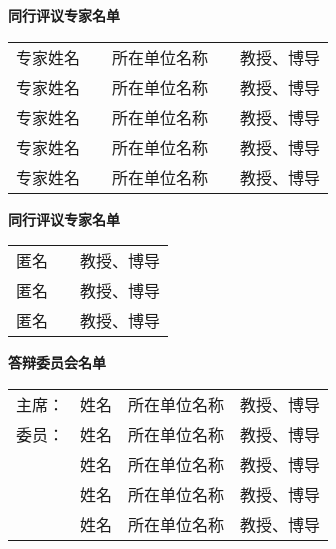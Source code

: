 \begin{titlepage}%
    \null
    \centering
    {\sffamily\fontsize{16pt}{32pt}\selectfont
    \textbf{同行评议专家名单}\par}
    \vskip 1.0cm
    \renewcommand\arraystretch{1.5}
    {\fontsize{16pt}{\baselineskip}\selectfont
        \begin{tabular}{@{}p{4\ccwd}p{1\ccwd}p{9\ccwd}<{\centering}p{1\ccwd}p{6\ccwd}<{\centering}@{}}%
            专家姓名 & & 所在单位名称 & & 教授、博导\\
            专家姓名 & & 所在单位名称 & & 教授、博导\\
            专家姓名 & & 所在单位名称 & & 教授、博导\\
            专家姓名 & & 所在单位名称 & & 教授、博导\\
            专家姓名 & & 所在单位名称 & & 教授、博导
        \end{tabular}\par%
    }
    \vskip 2.4cm%
    {\sffamily\fontsize{16pt}{32pt}\selectfont
    \textbf{同行评议专家名单}\par}%
    \vskip 1.0cm%
    {\fontsize{16pt}{\baselineskip}\selectfont
        \begin{tabular}{@{}p{4\ccwd}p{11\ccwd}p{6\ccwd}<{\centering}@{}}%
            匿名 & & 教授、博导\\
            匿名 & & 教授、博导\\
            匿名 & & 教授、博导
        \end{tabular}\par%
    }
    \vskip 2.4cm%
    {\sffamily\fontsize{16pt}{32pt}\selectfont
    \textbf{答辩委员会名单}\par}%
    \vskip 1.0cm%
    {\fontsize{16pt}{\baselineskip}\selectfont
        \begin{tabular}{@{}p{3\ccwd}p{3\ccwd}<{\centering}p{9\ccwd}p{6\ccwd}<{\centering}@{}}%
            主席： & 姓名 & 所在单位名称 & 教授、博导\\
            委员： & 姓名 & 所在单位名称 & 教授、博导\\
            & 姓名 & 所在单位名称 & 教授、博导\\
            & 姓名 & 所在单位名称 & 教授、博导\\
            & 姓名 & 所在单位名称 & 教授、博导
        \end{tabular}\par%
    }
    \renewcommand\arraystretch{1}
  \end{titlepage}%